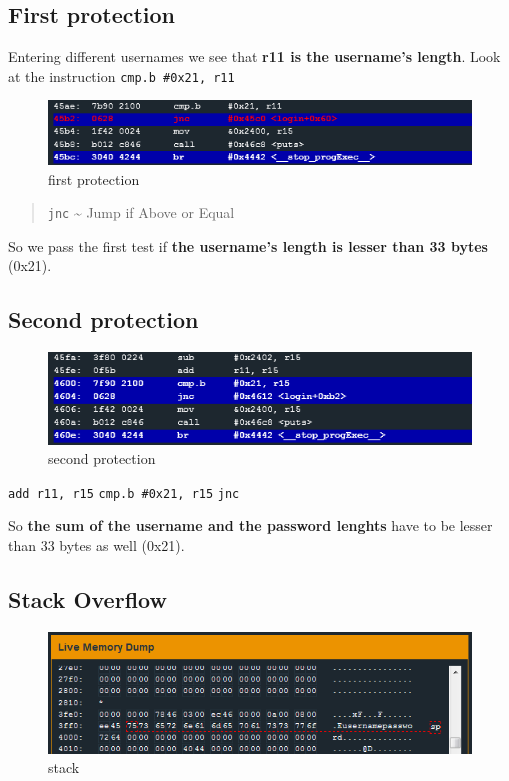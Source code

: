 \documentclass[a4paper,11pt]{article}
\begin{document}
\subsection{First protection}\label{first-protection-1}

Entering different usernames we see that \textbf{r11 is the username's
length}. Look at the instruction \texttt{cmp.b \#0x21, r11}

\begin{figure}[htbp]
\centering
\includegraphics{img/11_1.PNG}
\caption{first protection}
\end{figure}

\begin{quote}
\texttt{jnc} \textasciitilde{} Jump if Above or Equal
\end{quote}

So we pass the first test if \textbf{the username's length is lesser
than 33 bytes} (0x21).

\subsection{Second protection}\label{second-protection-1}

\begin{figure}[htbp]
\centering
\includegraphics{img/11_2.PNG}
\caption{second protection}
\end{figure}

\texttt{add r11, r15} \texttt{cmp.b \#0x21, r15} \texttt{jnc}

So \textbf{the sum of the username and the password lenghts} have to be
lesser than 33 bytes as well (0x21).

\subsection{Stack Overflow}\label{stack-overflow-1}

\begin{figure}[htbp]
\centering
\includegraphics{img/11_3.PNG}
\caption{stack}
\end{figure}
\end{document}
